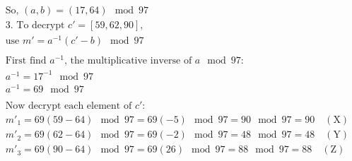 \documentclass{article}
\begin{document}
\begin{align*}
  &\text{So, } (a, b) = (17, 64) \mod 97 \\
  &\text{3. To decrypt } c' = [59, 62, 90], \\
  &\text{use } m' = a^{-1}(c' - b) \mod 97 \\
  & \\
  &\text{First find } a^{-1} \text{, the multiplicative inverse of } a \mod 97: \\
  &a^{-1} = 17^{-1} \mod 97 \\
  &a^{-1} = 69 \mod 97 \\
  & \\
  &\text{Now decrypt each element of } c': \\
  &m'_1 = 69(59 - 64) \mod 97 = 69(-5) \mod 97 = 90 \mod 97 = 90 \quad (\text{X}) \\
  &m'_2 = 69(62 - 64) \mod 97 = 69(-2) \mod 97 = 48 \mod 97 = 48 \quad (\text{Y}) \\
  &m'_3 = 69(90 - 64) \mod 97 = 69(26) \mod 97 = 88 \mod 97 = 88 \quad (\text{Z}) \\
\end{align*}
\end{document}
